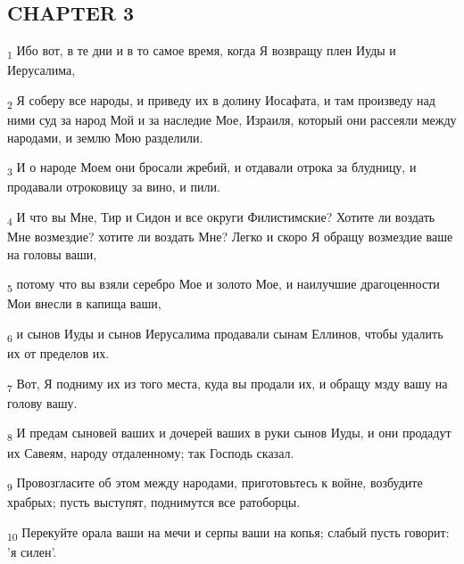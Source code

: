 \subsection{CHAPTER 3}
\begin{tcolorbox}
\textsubscript{1} Ибо вот, в те дни и в то самое время, когда Я возвращу плен Иуды и Иерусалима,
\end{tcolorbox}
\begin{tcolorbox}
\textsubscript{2} Я соберу все народы, и приведу их в долину Иосафата, и там произведу над ними суд за народ Мой и за наследие Мое, Израиля, который они рассеяли между народами, и землю Мою разделили.
\end{tcolorbox}
\begin{tcolorbox}
\textsubscript{3} И о народе Моем они бросали жребий, и отдавали отрока за блудницу, и продавали отроковицу за вино, и пили.
\end{tcolorbox}
\begin{tcolorbox}
\textsubscript{4} И что вы Мне, Тир и Сидон и все округи Филистимские? Хотите ли воздать Мне возмездие? хотите ли воздать Мне? Легко и скоро Я обращу возмездие ваше на головы ваши,
\end{tcolorbox}
\begin{tcolorbox}
\textsubscript{5} потому что вы взяли серебро Мое и золото Мое, и наилучшие драгоценности Мои внесли в капища ваши,
\end{tcolorbox}
\begin{tcolorbox}
\textsubscript{6} и сынов Иуды и сынов Иерусалима продавали сынам Еллинов, чтобы удалить их от пределов их.
\end{tcolorbox}
\begin{tcolorbox}
\textsubscript{7} Вот, Я подниму их из того места, куда вы продали их, и обращу мзду вашу на голову вашу.
\end{tcolorbox}
\begin{tcolorbox}
\textsubscript{8} И предам сыновей ваших и дочерей ваших в руки сынов Иуды, и они продадут их Савеям, народу отдаленному; так Господь сказал.
\end{tcolorbox}
\begin{tcolorbox}
\textsubscript{9} Провозгласите об этом между народами, приготовьтесь к войне, возбудите храбрых; пусть выступят, поднимутся все ратоборцы.
\end{tcolorbox}
\begin{tcolorbox}
\textsubscript{10} Перекуйте орала ваши на мечи и серпы ваши на копья; слабый пусть говорит: 'я силен'.
\end{tcolorbox}
